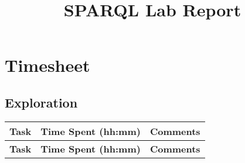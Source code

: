 \documentclass[11pt]{article}
\begin{document}
\title{\LARGE{\textbf{SPARQL Lab Report}}\vspace{-2em}}
\date{}
\maketitle



\setlength{\parindent}{0pt}

\section*{Timesheet}
\subsection*{Exploration}
\begin{longtable}{|p{3.9cm}|p{4.05cm}|p{6.8cm}|}
    \hline
    \textbf{Task} & \textbf{Time Spent (hh:mm)} & \textbf{Comments} \\ 
    \hline
    \endfirsthead
    
    \hline
    \textbf{Task} & \textbf{Time Spent (hh:mm)} & \textbf{Comments} \\ 
    \hline
    \endhead


\end{longtable}
\end{document}
